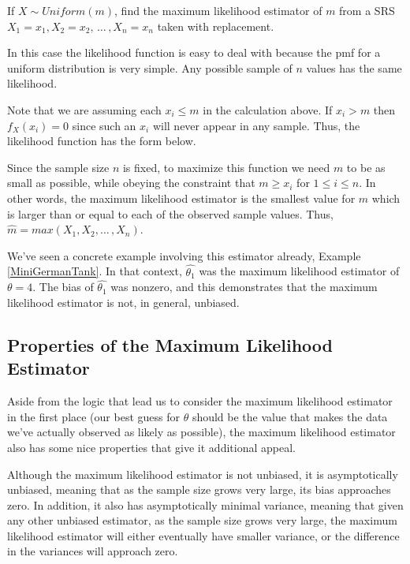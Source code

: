 \begin{examp}\label{TankProblemMLE}
If $X \sim Uniform(m)$, find the maximum likelihood estimator of $m$ from a SRS $X_1 = x_1, X_2 = x_2, \, \dots \,, X_n = x_n$ taken with replacement.
\par
\noindent In this case the likelihood function is easy to deal with because the pmf for a uniform distribution is very simple. Any possible sample of $n$ values has the same likelihood.
\par
\noindent Note that we are assuming each $x_i \leq m$ in the calculation above. If $x_i > m$ then $f_X(x_i) = 0$ since such an $x_i$ will never appear in any sample. Thus, the likelihood function has the form below.
\renewcommand*{\arraystretch}{1.35}
\renewcommand*{\arraystretch}{1}
\par
\noindent Since the sample size $n$ is fixed, to maximize this function we need $m$ to be as small as possible, while obeying the constraint that $m \geq x_i$ for $1 \leq i \leq n$. In other words, the maximum likelihood estimator is the smallest value for $m$ which is larger than or equal to each of the observed sample values. Thus, $\widehat{m} = max(X_1,X_2, \dots\,, X_n)$.
\end{examp}
\par
We've seen a concrete example involving this estimator already, Example \ref{MiniGermanTank}. In that context, $\widehat{\theta_1}$ was the maximum likelihood estimator of $\theta = 4$. The bias of $\widehat{\theta_1}$ was nonzero, and this demonstrates that the maximum likelihood estimator is not, in general, unbiased.

\subsection*{Properties of the Maximum Likelihood Estimator}

Aside from the logic that lead us to consider the maximum likelihood estimator in the first place (our best guess for $\theta$ should be the value that makes the data we've actually observed as likely as possible), the maximum likelihood estimator also has some nice properties that give it additional appeal.
\par
Although the maximum likelihood estimator is not unbiased, it is asymptotically unbiased, meaning that as the sample size grows very large, its bias approaches zero. In addition, it also has asymptotically minimal variance, meaning that given any other unbiased estimator, as the sample size grows very large, the maximum likelihood estimator will either eventually have smaller variance, or the difference in the variances will approach zero.


